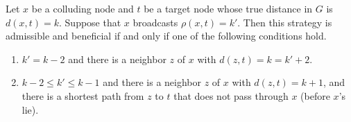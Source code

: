 \documentclass{comnet}
\begin{document}
\begin{theorem} \label{thm:single-agent}

Let $x$ be a colluding node and $t$ be a target node whose true distance in $G$
is $d(x,t) = k$. Suppose that $x$ broadcasts $\rho(x,t) = k'$. Then this
strategy is admissible and beneficial if and only if one of the following
conditions hold.

\begin{enumerate}
   \item $k' = k - 2$ and there is a neighbor $z$ of $x$ with $d(z,t) = k = k'
+ 2$.
   \item $k-2 \leq k' \leq k-1$ and there is a neighbor $z$ of $x$ with $d(z,t)
= k + 1$, and there is a shortest path from $z$ to $t$ that does not pass
through $x$ (before $x$'s lie).
\end{enumerate}

\end{theorem}
\end{document}
